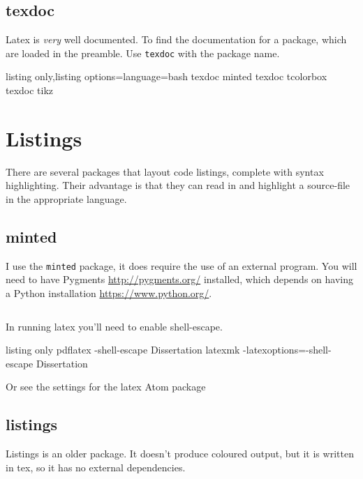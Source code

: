 \subsection{texdoc}
Latex is \emph{very} well documented.  To find the documentation for a package, which are loaded in the preamble.  Use \texttt{texdoc} with the package name.
\begin{tcblisting}{listing only,listing options={language=bash}}
    texdoc minted
    texdoc tcolorbox
    texdoc tikz
\end{tcblisting}

\section{Listings}
There are several packages that layout code listings, complete with syntax highlighting.  Their advantage is that they can read in and highlight a source-file in the appropriate language.


\subsection{minted}
I use the \texttt{minted} package,  it does require the use of an external program.  You will need to have Pygments \url{http://pygments.org/} installed, which depends on having a Python installation \url{https://www.python.org/}.

\begin{tcblisting}{}
\inputminted{c}{hello.c}
\end{tcblisting}

In running latex you'll need to enable shell-escape.
\begin{tcblisting}{listing only}
pdflatex -shell-escape Dissertation
latexmk -latexoptions=-shell-escape Dissertation
\end{tcblisting}
Or see the settings for the latex Atom package

\subsection{listings}
Listings is an older package.  It doesn't produce coloured output, but it is written in tex, so it has no external dependencies.
\begin{tcblisting}{}
\lstset{language=c}

\end{tcblisting}
